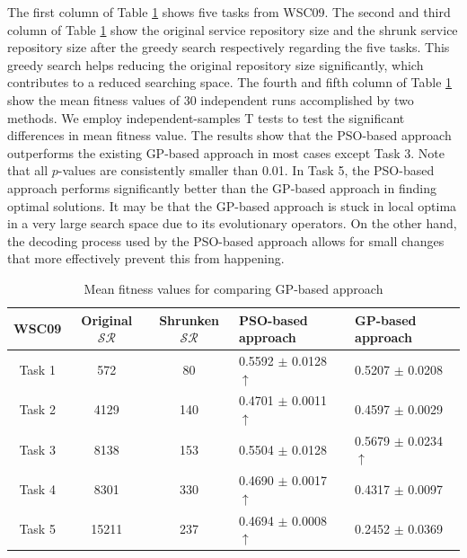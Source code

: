 \documentclass{llncs}
\begin{document}
The first column of Table \ref{meanFitness} shows five tasks from WSC09. The second and third column of Table \ref{meanFitness} show the original service repository size and the shrunk service repository size after the greedy search respectively regarding the five tasks. This greedy search helps reducing the original repository size significantly, which contributes to a reduced searching space. The fourth and fifth column of Table \ref{meanFitness} show the mean fitness values of 30 independent runs accomplished by two methods. We employ independent-samples T tests to test the significant differences in mean fitness value. The results show that the PSO-based approach outperforms the existing GP-based approach in most cases except Task 3. Note that all $p$-values are consistently smaller than 0.01. In Task 5, the PSO-based approach performs significantly better than the GP-based approach in finding optimal solutions. It may be that the GP-based approach is stuck in local optima in a very large search space due to its evolutionary operators. On the other hand, the decoding process used by the PSO-based approach allows for small changes that more effectively prevent this from happening.
\vspace{-0.8cm}
\begin{table}[]
\centering
\caption{Mean fitness values for comparing GP-based approach}
\label{meanFitness}
\begin{tabular}{c|c|c|l|l}
\hline
\multicolumn{1}{c|}{WSC09} &Original $\mathcal{SR}$  &Shrunken $\mathcal{SR}$   &PSO-based approach & GP-based approach  \\ \hline
Task 1                     &572            &80    &0.5592 $\pm$ 0.0128  $\uparrow$  &0.5207 $\pm$ 0.0208           \\ \hline
Task 2                     &4129           &140   &0.4701 $\pm$ 0.0011  $\uparrow$  &0.4597 $\pm$ 0.0029          \\ \hline
Task 3                     &8138           &153   &0.5504 $\pm$ 0.0128              &0.5679 $\pm$ 0.0234 $\uparrow$   \\ \hline
Task 4                     &8301           &330   &0.4690 $\pm$ 0.0017  $\uparrow$  &0.4317 $\pm$ 0.0097            \\ \hline
Task 5                     &15211          &237   &0.4694 $\pm$ 0.0008  $\uparrow$  &0.2452 $\pm$ 0.0369            \\ \hline
\end{tabular}
\end{table}
\vspace{-0.8cm}
\end{document}
